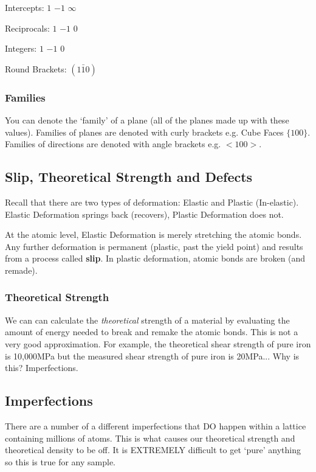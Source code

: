 \documentclass[12pt]{article}
\begin{document}
\begin{example}
  Intercepts: $1$ $-1$ $\infty$

  Reciprocals: $1$ $-1$ $0$

  Integers: $1$ $-1$ $0$

  Round Brackets: $(1\bar{1}0)$
\end{example}

\subsubsection{Families}
You can denote the `family' of a plane (all of the planes made up with these values). 
Families of planes are denoted with curly brackets e.g. Cube Faces $\{100\}$.
Families of directions are denoted with angle brackets e.g. $<100>$.

\subsection{Slip, Theoretical Strength and Defects}
Recall that there are two types of deformation: Elastic and Plastic (In-elastic).
Elastic Deformation springs back (recovers), Plastic Deformation does not.

At the atomic level, Elastic Deformation is merely stretching the atomic bonds.
Any further deformation is permanent (plastic, past the yield point) and results from a process called \textbf{slip}.
In plastic deformation, atomic bonds are broken (and remade).

\subsubsection{Theoretical Strength}
We can can calculate the \textit{theoretical} strength of a material by evaluating the amount of energy needed to break and remake the atomic bonds.
This is not a very good approximation. For example, the theoretical shear strength of pure iron is 10,000MPa but the measured shear strength of pure iron is 20MPa...
Why is this? Imperfections.

\subsection{Imperfections}
There are a number of a different imperfections that DO happen within a lattice containing millions of atoms.
This is what causes our theoretical strength and theoretical density to be off. 
It is EXTREMELY difficult to get `pure' anything so this is true for any sample.
\end{document}
